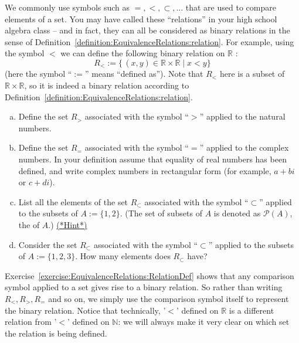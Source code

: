 We commonly use symbols  such as $=, < , \subset, \ldots $  that are used to compare elements of a set. You may have called these ``relations'' in your high school algebra class -- and in fact, they can all be considered as binary relations in the sense of Definition~\ref{definition:EquivalenceRelations:relation}.
For example, using the symbol $<$ we can define the following binary relation on ${\mathbb R}$ :
\[ R_<  := \{\, (x,y) \in \mathbb{R} \times \mathbb{R} \mid x < y \}  \]
(here the symbol ``$:=$'' means ``defined as'').  Note that $ R_<$ here is a subset of $\mathbb{R} \times \mathbb{R}$, so it is indeed a binary relation according to Definition~\ref{definition:EquivalenceRelations:relation}. 


\begin{exer}\label{exercise:EquivalenceRelations:RelationDef}
\begin{enumerate}[(a)]
 \item  
 Define the set $R_>$ associated with the symbol ``$>$'' applied to the natural numbers.
 \item  
 Define the set $R_=$ associated with the symbol ``$=$'' applied to the complex numbers. In your definition assume that equality of real numbers has been defined, and write complex numbers in rectangular form (for example, $a + bi$ or $c + di$).
 \item  
 List all the elements of the set $R_\subset$ associated with the symbol ``$\subset$'' applied to the subsets of $A := \{1,2\}$. (The set of subsets of $A$ is denoted as $\mathcal{P}(A)$, the  of $A$.)
 \hyperref[sec:EquivalenceRelations:Hints]{(*Hint*)}
 \item  
Consider the set $R_\subset$ associated with the symbol ``$\subset$'' applied to the subsets of $A := \{1,2,3\}$. How many elements does $R_\subset$ have?
 \end{enumerate}
 \end{exer}
 
Exercise~\ref{exercise:EquivalenceRelations:RelationDef} shows that any comparison symbol applied to a set gives rise to a binary relation. So rather than writing $R_<, R_>, R_=$ and so on, we simply use the comparison symbol itself to represent the binary relation.  Notice that technically, '$<$' defined on $\mathbb{R}$ is a different relation from '$<$' defined on $\mathbb{N}$: we will always make it very clear on which set the relation is being defined.

